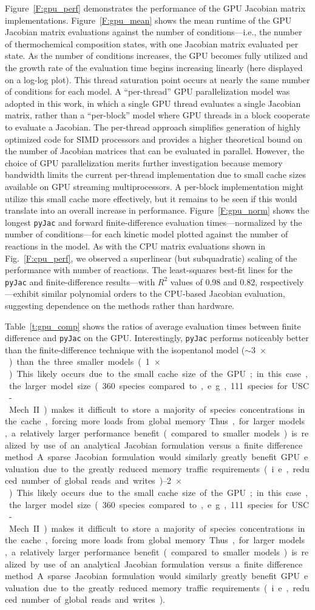 \documentclass[preprint,12pt]{elsarticle}
\begin{document}
{Figure~\ref{F:gpu_perf} demonstrates the performance of the GPU Jacobian matrix implementations.
Figure~\ref{F:gpu_mean} shows the mean runtime of the GPU Jacobian matrix evaluations against the number of conditions---i.e., the number of thermochemical composition states, with one Jacobian matrix evaluated per state.
As the number of conditions increases, the GPU becomes fully utilized and the growth rate of the evaluation time begins increasing linearly (here displayed on a log-log plot).
This thread saturation point occurs at nearly the same number of conditions for each model.
A ``per-thread'' GPU parallelization model was adopted in this work, in which a single GPU thread evaluates a single Jacobian matrix, rather than a ``per-block'' model where GPU threads in a block cooperate to evaluate a Jacobian.
The per-thread approach simplifies generation of highly optimized code for SIMD processors and provides a higher theoretical bound on the number of Jacobian matrices that can be evaluated in parallel.
However, the choice of GPU parallelization merits further investigation because memory bandwidth limits the current per-thread implementation due to small cache sizes available on GPU streaming multiprocessors.
A per-block implementation might utilize this small cache more effectively, but it remains to be seen if this would translate into an overall increase in performance.
Figure~\ref{F:gpu_norm} shows the longest \texttt{pyJac} and forward finite-difference evaluation times---normalized by the number of conditions---for each kinetic model plotted against the number of reactions in the model.
As with the CPU matrix evaluations shown in Fig.~\ref{F:cpu_perf}, we observed a superlinear (but subquadratic) scaling of the performance with number of reactions.
The least-squares best-fit lines for the \texttt{pyJac} and finite-difference results---with $R^2$ values of 0.98 and 0.82, respectively---exhibit similar polynomial orders to the CPU-based Jacobian evaluation, suggesting dependence on the methods rather than hardware.

Table~\ref{t:gpu_comp} shows the ratios of average evaluation times between finite difference and \texttt{pyJac} on the GPU.
Interestingly, \texttt{pyJac} performs noticeably better than the finite-difference technique with the isopentanol model ($\sim$\SI{3}{$\times$}) than the three smaller models (\SIrange{1}{2}{$\times$}).
This likely occurs due to the small cache size of the GPU; in this case, the larger model size (360 species compared to, e.g., 111 species for USC-Mech II) makes it difficult to store a majority of species concentrations in the cache, forcing more loads from global memory.
Thus, for larger models, a relatively larger performance benefit (compared to smaller models) is realized by use of an analytical Jacobian formulation versus a finite difference method.
A sparse Jacobian formulation would similarly greatly benefit GPU evaluation due to the greatly reduced memory traffic requirements (i.e., reduced number of global reads and writes).

}
\end{document}
